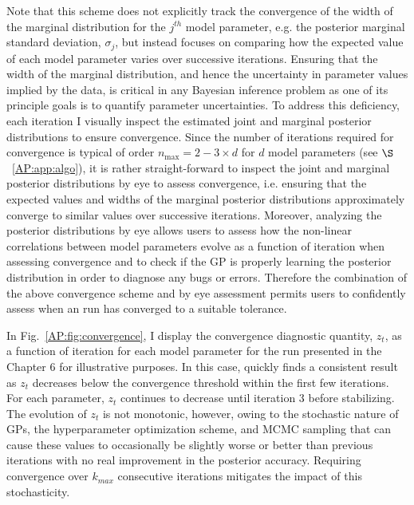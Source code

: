 Note that this scheme does not explicitly track the convergence of the width of the marginal distribution for the $j^{th}$ model parameter, e.g. the posterior marginal standard deviation, $\sigma_j$, but instead focuses on comparing how the expected value of each model parameter varies over successive \approxposterior iterations. Ensuring that the width of the marginal distribution, and hence the uncertainty in parameter values implied by the data, is critical in any Bayesian inference problem as one of its principle goals is to quantify parameter uncertainties. To address this deficiency, each \approxposterior iteration I visually inspect the estimated joint and marginal posterior distributions to ensure convergence. Since the number of \approxposterior iterations required for convergence is typical of order $n_{\mathrm{max}}=2-3 \times d$ for $d$ model parameters (see $\S$~\ref{AP:app:algo}), it is rather straight-forward to inspect the joint and marginal posterior distributions by eye to assess convergence, i.e. ensuring that the expected values and widths of the marginal posterior distributions approximately converge to similar values over successive iterations. Moreover, analyzing the posterior distributions by eye allows users to assess how the non-linear correlations between model parameters evolve as a function of \approxposterior iteration when assessing convergence and to check if the GP is properly learning the posterior distribution in order to diagnose any bugs or errors. Therefore the combination of the above convergence scheme and by eye assessment permits users to confidently assess when an \approxposterior run has converged to a suitable tolerance.

In Fig.~\ref{AP:fig:convergence}, I display the convergence diagnostic quantity, $z_t$, as a function of iteration for each model parameter for the \approxposterior run presented in the Chapter 6 for illustrative purposes. In this case, \approxposterior quickly finds a consistent result as $z_t$ decreases below the convergence threshold within the first few iterations. For each parameter, $z_t$ continues to decrease until iteration 3 before stabilizing. The evolution of $z_t$ is not monotonic, however, owing to the stochastic nature of GPs, the hyperparameter optimization scheme, and MCMC sampling that can cause these values to occasionally be slightly worse or better than previous iterations with no real improvement in the posterior accuracy. Requiring convergence over $k_{max}$ consecutive iterations mitigates the impact of this stochasticity.

